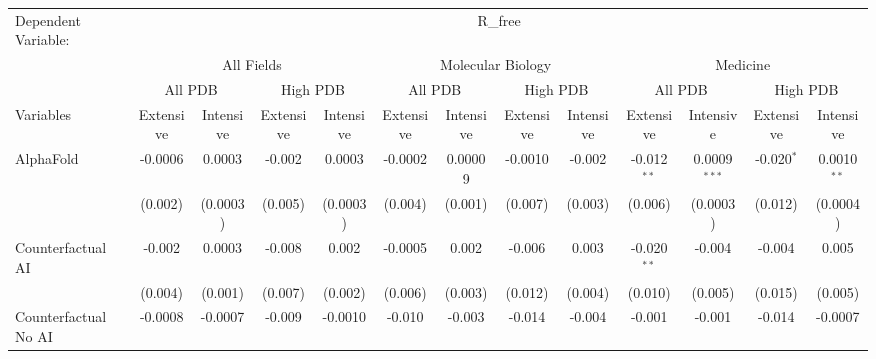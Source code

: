 \begingroup
\centering
\begin{tabular}{lcccccccccccc}
   \tabularnewline \midrule \midrule
   Dependent Variable: & \multicolumn{12}{c}{R\_free}\\
 & \multicolumn{4}{c}{All Fields} & \multicolumn{4}{c}{Molecular Biology} & \multicolumn{4}{c}{Medicine} \\
\cmidrule(lr){2-5} \cmidrule(lr){6-9} \cmidrule(lr){10-13}
 & \multicolumn{2}{c}{All PDB} & \multicolumn{2}{c}{High PDB} & \multicolumn{2}{c}{All PDB} & \multicolumn{2}{c}{High PDB} & \multicolumn{2}{c}{All PDB} & \multicolumn{2}{c}{High PDB} \\
\cmidrule(lr){2-3} \cmidrule(lr){4-5} \cmidrule(lr){6-7} \cmidrule(lr){8-9} \cmidrule(lr){10-11} \cmidrule(lr){12-13}
Variables & \multicolumn{1}{c}{Extensive} & \multicolumn{1}{c}{Intensive} & \multicolumn{1}{c}{Extensive} & \multicolumn{1}{c}{Intensive} & \multicolumn{1}{c}{Extensive} & \multicolumn{1}{c}{Intensive} & \multicolumn{1}{c}{Extensive} & \multicolumn{1}{c}{Intensive} & \multicolumn{1}{c}{Extensive} & \multicolumn{1}{c}{Intensive} & \multicolumn{1}{c}{Extensive} & \multicolumn{1}{c}{Intensive} \\
\cmidrule(lr){1-1}\cmidrule(lr){2-2} \cmidrule(lr){3-3} \cmidrule(lr){4-4} \cmidrule(lr){5-5} \cmidrule(lr){6-6} \cmidrule(lr){7-7} \cmidrule(lr){8-8} \cmidrule(lr){9-9} \cmidrule(lr){10-10} \cmidrule(lr){11-11} \cmidrule(lr){12-12} \cmidrule(lr){13-13}
   AlphaFold                                & -0.0006 & 0.0003        & -0.002  & 0.0003   & -0.0002 & 0.00009 & -0.0010     & -0.002       & -0.012$^{**}$ & 0.0009$^{***}$ & -0.020$^{*}$ & 0.0010$^{**}$\\   
                                            & (0.002) & (0.0003)      & (0.005) & (0.0003) & (0.004) & (0.001) & (0.007)     & (0.003)      & (0.006)       & (0.0003)       & (0.012)      & (0.0004)\\   
   Counterfactual AI                        & -0.002  & 0.0003        & -0.008  & 0.002    & -0.0005 & 0.002   & -0.006      & 0.003        & -0.020$^{**}$ & -0.004         & -0.004       & 0.005\\   
                                            & (0.004) & (0.001)       & (0.007) & (0.002)  & (0.006) & (0.003) & (0.012)     & (0.004)      & (0.010)       & (0.005)        & (0.015)      & (0.005)\\   
   Counterfactual No AI                     & -0.0008 & -0.0007       & -0.009  & -0.0010  & -0.010  & -0.003  & -0.014      & -0.004       & -0.001        & -0.001         & -0.014       & -0.0007\\   

\end{tabular}
